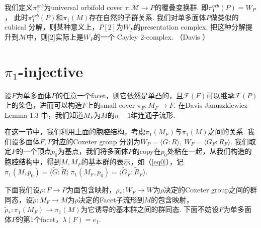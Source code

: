 \documentclass{article}
\theoremstyle{plain}%
\theoremstyle{definition}
\theoremstyle{remark}
\begin{document}
我们定义$\pi_1^{orb}$为universal orbifold cover $\tau:\mathcal{M}\longrightarrow P$的覆叠变换群.
即$\pi_1^{orb}(P)=W_P$，
此时$\pi_1^{orb}(P)$和$\pi_1(M)$存在自然的子群关系.
我们对单多面体$P$做类似的cubical 分解，则某种意义上，$P[2]$为$W_P$的presentation complex. 把这种分解提升到$\mathcal{M}$中，则$\mathcal[2]$实际上是$W_P$的一个 Cayley 2-complex. （Davis \cite{D2}）

 


\section{$\pi_1$-injective}
设$F$为单多面体$P$的任意一个facet，则它依然是单凸的，且$\mathcal{F}(F)$可以继承$\mathcal{F}(P)$上的染色，进而可以构造$F$上的small cover $\pi_F:M_F\longrightarrow F$. 在Davis-Januszkiewicz \cite{DJ1} Lemma 1.3 中，我们知道$M_F$为$M$的$n-1$维连通子流形. 

在这一节中，我们利用上面的胞腔结构，考虑$\pi_1(M_F)$与$\pi_1(M)$之间的关系. 我们设多面体$F,P$对应的Coxeter group 分别为$W_P=\langle G:R \rangle,~W_F=\langle G_F:R_F\rangle$.
我们取定$F$的一个顶点$p_0$为基点，我们将多面体$P$的copy在$p_0$处粘在一起，从我们构造的胞腔结构中，得到$M,M_F$的基本群的表示，如（\ref{eq0}），记$\pi_1(M,p_0)=\langle \widetilde{G}:\widetilde{R}\rangle~\pi_1(M_F,p_0)=\langle \widetilde{G}_F:\widetilde{R}_F\rangle$. 

下面我们设$\rho:F\longrightarrow P$为面包含映射，$\rho_*:W_F\longrightarrow W$为$\rho$决定的Coxeter group之间的群同态，设$\widetilde{\rho}:M_F\longrightarrow M$为$\rho$决定的Facet子流形到$M$的包含映射，$\widetilde{\rho}_*:\pi_1(M_F)\longrightarrow\pi_1(M)$为它诱导的基本群之间的群同态.
下面不妨设$F$为单多面体$P$的第$1$个facet，$\lambda(F)=e_1$.
\end{document}
